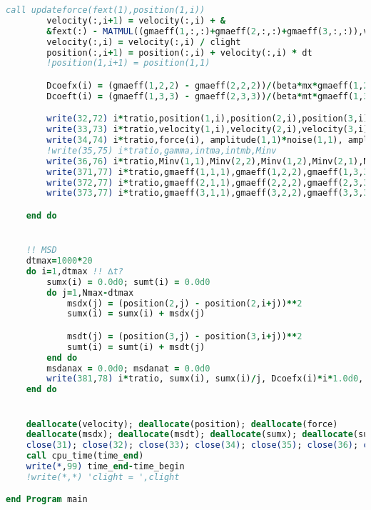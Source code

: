 \documentclass[fleqn,10pt]{InternshipReport_SI-ENS-PSL}
\begin{document}
\begin{lstlisting}[language=Fortran, caption=BEHD\_YYE.f90]
        call updateforce(fext(1),position(1,i))
        velocity(:,i+1) = velocity(:,i) + &
        &fext(:) - MATMUL((gmaeff(1,:,:)+gmaeff(2,:,:)+gmaeff(3,:,:)),velocity(:,i)) + MATMUL(amplitude(:,:),noise(:,1))
        velocity(:,i) = velocity(:,i) / clight
        position(:,i+1) = position(:,i) + velocity(:,i) * dt
        !position(1,i+1) = position(1,1)

        Dcoefx(i) = (gmaeff(1,2,2) - gmaeff(2,2,2))/(beta*mx*gmaeff(1,2,2)**2)
        Dcoeft(i) = (gmaeff(1,3,3) - gmaeff(2,3,3))/(beta*mt*gmaeff(1,3,3)**2)

        write(32,72) i*tratio,position(1,i),position(2,i),position(3,i)
        write(33,73) i*tratio,velocity(1,i),velocity(2,i),velocity(3,i)
        write(34,74) i*tratio,force(i), amplitude(1,1)*noise(1,1), amplitude(2,2)*noise(2,1), amplitude(3,3)*noise(3,1)
        !write(35,75) i*tratio,gamma,intma,intmb,Minv
        write(36,76) i*tratio,Minv(1,1),Minv(2,2),Minv(1,2),Minv(2,1),Minv(2,2)
        write(371,77) i*tratio,gmaeff(1,1,1),gmaeff(1,2,2),gmaeff(1,3,3),gmaeff(1,1,2),gmaeff(1,1,3),gmaeff(1,2,3)
        write(372,77) i*tratio,gmaeff(2,1,1),gmaeff(2,2,2),gmaeff(2,3,3),gmaeff(2,1,2),gmaeff(2,1,3),gmaeff(2,2,3)
        write(373,77) i*tratio,gmaeff(3,1,1),gmaeff(3,2,2),gmaeff(3,3,3),gmaeff(3,1,2),gmaeff(3,1,3),gmaeff(3,2,3)

    end do


    !! MSD
    dtmax=1000*20
    do i=1,dtmax !! ∆t?
        sumx(i) = 0.0d0; sumt(i) = 0.0d0
        do j=1,Nmax-dtmax
            msdx(j) = (position(2,j) - position(2,i+j))**2
            sumx(i) = sumx(i) + msdx(j)

            msdt(j) = (position(3,j) - position(3,i+j))**2
            sumt(i) = sumt(i) + msdt(j)
        end do
        msdanax = 0.0d0; msdanat = 0.0d0
        write(381,78) i*tratio, sumx(i), sumx(i)/j, Dcoefx(i)*i*1.0d0, sumt(i), sumt(i)/j, Dcoeft(i)*i*1.0d0
    end do


    deallocate(velocity); deallocate(position); deallocate(force) 
    deallocate(msdx); deallocate(msdt); deallocate(sumx); deallocate(sumt); deallocate(Dcoefx); deallocate(Dcoeft)
    close(31); close(32); close(33); close(34); close(35); close(36); close(371); close(372); close(373); close(381)
    call cpu_time(time_end)
    write(*,99) time_end-time_begin
    !write(*,*) 'clight = ',clight

end Program main



\end{lstlisting}
\end{document}
